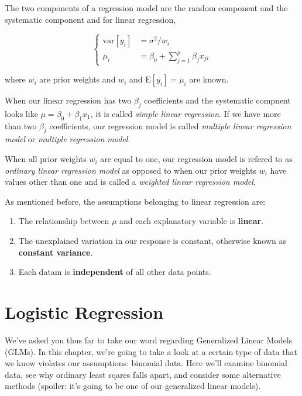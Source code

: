 \documentclass[
]{book}
\providecommand{\tightlist}{%
  \setlength{\itemsep}{0pt}\setlength{\parskip}{0pt}}
\begin{document}
The two components of a regression model are the random component and the systematic component and for linear regression,

\[
\begin{cases}
  \text{var}[y_i] &= \sigma^2/w_i \\
  \mu_i &= \beta_0 + \sum_{j=1}^{p}\beta_jx_{ji}
\end{cases}
\]

where \(w_i\) are prior weights and \(w_i\) and \(\text{E}[y_i] = \mu_i\) are known.

When our linear regression has two \(\beta_j\) coefficients and the systematic compnent looks like \(\mu = \beta_0 + \beta_1x_1\), it is called \emph{simple linear regression}. If we have more than two \(\beta_j\) coefficients, our regression model is called \emph{multiple linear regression model} or \emph{multiple regression model}.

When all prior weights \(w_i\) are equal to one, our regression model is refered to as \emph{ordinary linear regression model} as opposed to when our prior weights \(w_i\) have values other than one and is called a \emph{weighted linear regression model}.

As mentioned before, the assumptions belonging to linear regression are:

\begin{enumerate}
\def\labelenumi{\arabic{enumi}.}
\tightlist
\item
  The relationship between \(\mu\) and each explanatory variable is \textbf{linear}.
\item
  The unexplained variation in our response is constant, otherwise known as \textbf{constant variance}.
\item
  Each datam is \textbf{independent} of all other data points.
\end{enumerate}

\hypertarget{logistic-regression}{%
\chapter{Logistic Regression}\label{logistic-regression}}

We've asked you thus far to take our word regarding Generalized Linear Models (GLMs). In this chapter, we're going to take a look at a certain type of data that we know violates our assumptions: binomial data. Here we'll examine binomial data, see why ordinary least sqares falls apart, and consider some alternative methods (spoiler: it's going to be one of our generalized linear models).
\end{document}
